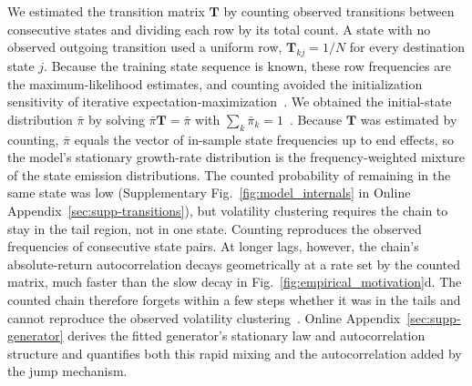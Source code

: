 We estimated the transition matrix $\mathbf{T}$ by counting observed
transitions between consecutive states and dividing each row by its
total count. A state with no observed outgoing transition used a
uniform row, $\mathbf{T}_{kj}=1/N$ for every destination state $j$.
Because the training state sequence is known, these row frequencies
are the maximum-likelihood estimates, and counting avoided the
initialization sensitivity of iterative
expectation-maximization~\cite{bilmes1998}. We obtained the
initial-state distribution $\bar{\pi}$ by solving
$\bar{\pi}\mathbf{T}=\bar{\pi}$ with
$\sum_k\bar{\pi}_k=1$~\cite{hamilton2018regime, grinsteadSnell1997}.
Because $\mathbf{T}$ was estimated by counting, $\bar{\pi}$ equals
the vector of in-sample state frequencies up to end effects, so the
model's stationary growth-rate distribution is the
frequency-weighted mixture of the state emission distributions. The counted probability of remaining in the same state was low
(Supplementary Fig.~\ref{fig:model_internals} in Online
Appendix~\ref{sec:supp-transitions}), but volatility clustering
requires the chain to stay in the tail region, not in one state. Counting reproduces the observed
frequencies of consecutive state pairs. At longer lags, however, the
chain's absolute-return autocorrelation decays geometrically at a rate
set by the counted matrix, much faster than the slow decay in
Fig.~\ref{fig:empirical_motivation}d. The counted chain therefore
forgets within a few steps whether it was in the tails and cannot
reproduce the observed volatility clustering~\cite{bullaBulla2006}. Online
Appendix~\ref{sec:supp-generator} derives the fitted generator's
stationary law and autocorrelation structure and quantifies both this
rapid mixing and the autocorrelation added by the jump mechanism.

